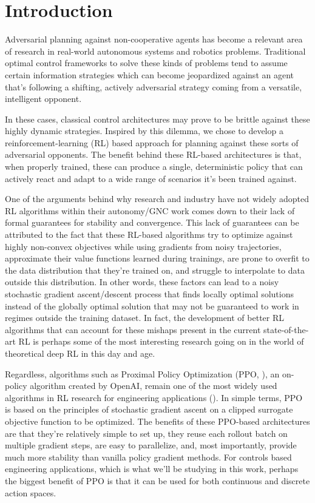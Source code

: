\chapter{Introduction}


Adversarial planning against non-cooperative agents has become a relevant area of research in real-world autonomous systems and robotics problems. Traditional optimal control frameworks to solve these kinds of problems tend to assume certain information strategies which can become jeopardized against an agent that's following a shifting, actively adversarial strategy coming from a versatile, intelligent opponent. 

In these cases, classical control architectures may prove to be brittle against these highly dynamic strategies. Inspired by this dilemma, we chose to develop a reinforcement-learning (RL) based approach for planning against these sorts of adversarial opponents. The benefit behind these RL-based architectures is that, when properly trained, these can produce a single, deterministic policy that can actively react and adapt to a wide range of scenarios it's been trained against.

One of the arguments behind why research and industry have not widely adopted RL algorithms  within their autonomy/GNC work comes down to their  lack of formal guarantees for stability and convergence. This lack of guarantees can be attributed to the fact that these RL-based algorithms try to optimize against highly non-convex objectives while using gradients from noisy trajectories, approximate their value functions learned during trainings, are prone to overfit to the data distribution that they're trained on, and struggle to interpolate to data outside this distribution. In other words, these factors can lead to a noisy stochastic gradient ascent/descent process that finds locally optimal solutions instead of the globally optimal solution that may not be guaranteed to work in regimes outside the training dataset. In fact, the development of better RL algorithms that can account for these mishaps present in the current state-of-the-art RL is perhaps some of the most interesting research going on in the world of theoretical deep RL in this day and age. 

Regardless, algorithms such as Proximal Policy Optimization (PPO, \cite{schulman2017ppo}), an on-policy algorithm created by OpenAI, remain one of the most widely used algorithms in RL research for engineering applications (\cite{francois2018introduction}). In simple terms, PPO is based on the principles of stochastic gradient ascent on a clipped surrogate objective function to be optimized. The benefits of these PPO-based architectures are that they're relatively simple to set up, they reuse each rollout batch on multiple gradient steps, are easy to parallelize, and, most importantly, provide much more stability than vanilla policy gradient methods. For controls based engineering applications, which is what we'll be studying in this work, perhaps the biggest benefit of PPO is that it can be used for both continuous and discrete action spaces.



